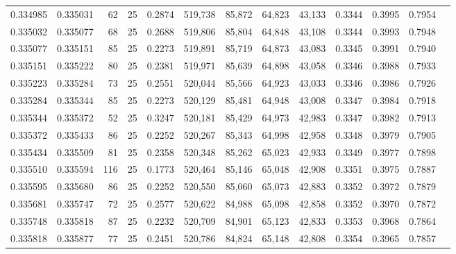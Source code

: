 \begin{tabular}{rrrrrrrrrrrrr}
0.334985 & 0.335031 &    62 &  25 &                                     0.2874 & 519,738 &  85,872 &  64,823 &  43,133 & 0.3344 & 0.3995 & 0.7954 \\
0.335032 & 0.335077 &    68 &  25 &                                     0.2688 & 519,806 &  85,804 &  64,848 &  43,108 & 0.3344 & 0.3993 & 0.7948 \\
0.335077 & 0.335151 &    85 &  25 &                                     0.2273 & 519,891 &  85,719 &  64,873 &  43,083 & 0.3345 & 0.3991 & 0.7940 \\
0.335151 & 0.335222 &    80 &  25 &                                     0.2381 & 519,971 &  85,639 &  64,898 &  43,058 & 0.3346 & 0.3988 & 0.7933 \\
0.335223 & 0.335284 &    73 &  25 &                                     0.2551 & 520,044 &  85,566 &  64,923 &  43,033 & 0.3346 & 0.3986 & 0.7926 \\
0.335284 & 0.335344 &    85 &  25 &                                     0.2273 & 520,129 &  85,481 &  64,948 &  43,008 & 0.3347 & 0.3984 & 0.7918 \\
0.335344 & 0.335372 &    52 &  25 &                                     0.3247 & 520,181 &  85,429 &  64,973 &  42,983 & 0.3347 & 0.3982 & 0.7913 \\
0.335372 & 0.335433 &    86 &  25 &                                     0.2252 & 520,267 &  85,343 &  64,998 &  42,958 & 0.3348 & 0.3979 & 0.7905 \\
0.335434 & 0.335509 &    81 &  25 &                                     0.2358 & 520,348 &  85,262 &  65,023 &  42,933 & 0.3349 & 0.3977 & 0.7898 \\
0.335510 & 0.335594 &   116 &  25 &                                     0.1773 & 520,464 &  85,146 &  65,048 &  42,908 & 0.3351 & 0.3975 & 0.7887 \\
0.335595 & 0.335680 &    86 &  25 &                                     0.2252 & 520,550 &  85,060 &  65,073 &  42,883 & 0.3352 & 0.3972 & 0.7879 \\
0.335681 & 0.335747 &    72 &  25 &                                     0.2577 & 520,622 &  84,988 &  65,098 &  42,858 & 0.3352 & 0.3970 & 0.7872 \\
0.335748 & 0.335818 &    87 &  25 &                                     0.2232 & 520,709 &  84,901 &  65,123 &  42,833 & 0.3353 & 0.3968 & 0.7864 \\
0.335818 & 0.335877 &    77 &  25 &                                     0.2451 & 520,786 &  84,824 &  65,148 &  42,808 & 0.3354 & 0.3965 & 0.7857 \\

\end{tabular}
